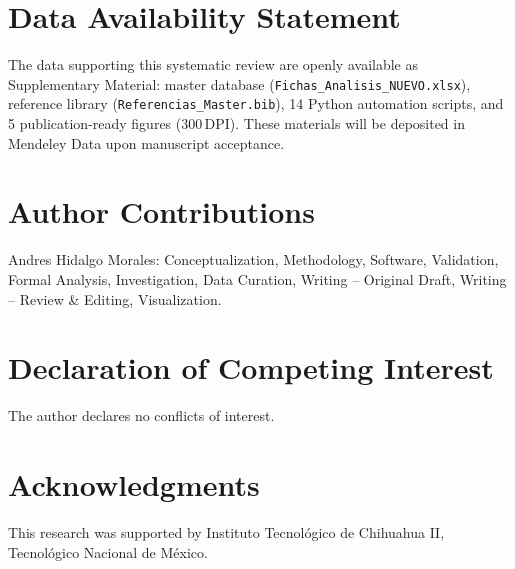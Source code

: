 \documentclass[review,3p,times]{elsarticle}
\begin{document}
\section*{Data Availability Statement}
The data supporting this systematic review are openly available as Supplementary Material: master database (\texttt{Fichas\_Analisis\_NUEVO.xlsx}), reference library (\texttt{Referencias\_Master.bib}), 14 Python automation scripts, and 5 publication-ready figures (300\,DPI). These materials will be deposited in Mendeley Data upon manuscript acceptance.

\section*{Author Contributions}
Andres Hidalgo Morales: Conceptualization, Methodology, Software, Validation, Formal Analysis, Investigation, Data Curation, Writing -- Original Draft, Writing -- Review \& Editing, Visualization.

\section*{Declaration of Competing Interest}
The author declares no conflicts of interest.

\section*{Acknowledgments}
This research was supported by Instituto Tecnológico de Chihuahua II, Tecnológico Nacional de México.



\end{document}
